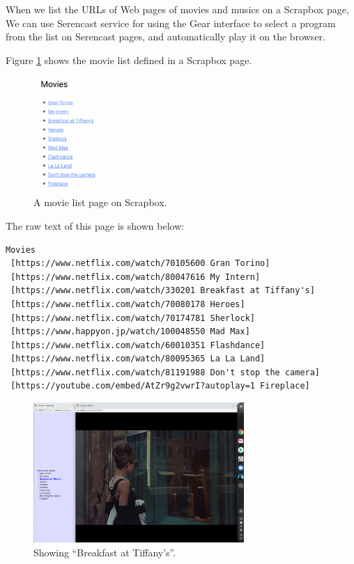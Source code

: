 \documentclass[conference]{IEEEtran}
\def\SC{Serencast}
\def\SB{Scrapbox}
\begin{document}
When we list the URLs of Web pages of
movies and musics on a {\SB} page,
We can use {\SC} service
for using the Gear interface to select a program from the
list on {\SC} pages, and automatically play it on the browser.

Figure \ref{movielist} shows the movie list defined in a {\SB} page.

\begin{figure}[H]
\centerline{\includegraphics[width=30mm,bb=0 0 387 568]{figures/2b97930bf5730fcaf4d9c0adeb9c5f6e.png}}
\caption{A movie list page on {\SB}.}
\label{movielist}
\end{figure}

The raw text of this page is shown below:

{\scriptsize
\begin{verbatim}
Movies
 [https://www.netflix.com/watch/70105600 Gran Torino]
 [https://www.netflix.com/watch/80047616 My Intern]
 [https://www.netflix.com/watch/330201 Breakfast at Tiffany's]
 [https://www.netflix.com/watch/70080178 Heroes]
 [https://www.netflix.com/watch/70174781 Sherlock]
 [https://www.happyon.jp/watch/100048550 Mad Max]
 [https://www.netflix.com/watch/60010351 Flashdance]
 [https://www.netflix.com/watch/80095365 La La Land]
 [https://www.netflix.com/watch/81191988 Don't stop the camera]
 [https://youtube.com/embed/AtZr9g2vwrI?autoplay=1 Fireplace]
\end{verbatim}}

\begin{figure}[H]
\centerline{\includegraphics[width=80mm,bb=0 0 2400 1600]{figures/e8ae562a5a68a1955ac70b4faed9a146.png}}
\caption{Showing ``Breakfast at Tiffany's''.}
\label{tiffany}
\end{figure}
\end{document}
